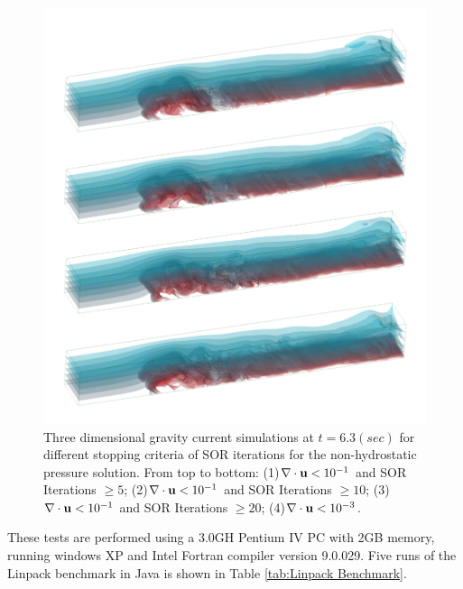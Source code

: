 \begin{figure}[htb]
\hspace{0.0in}
\includegraphics[width=5.8in]{../figures/ANH/3D/ANH-3D.pdf}
\caption{Three dimensional gravity current simulations at $t = 6.3 (sec)$ for different stopping criteria of SOR iterations for the non-hydrostatic pressure solution.
From top to bottom:
(1)$\nabla \cdot \mathbf{u} < 10^{-1}$ and SOR Iterations $\geq 5  $;
(2)$\nabla \cdot \mathbf{u} < 10^{-1}$ and SOR Iterations $\geq 10  $;
(3)$\nabla \cdot \mathbf{u} < 10^{-1}$ and SOR Iterations $\geq 20  $;
(4)$\nabla \cdot \mathbf{u} < 10^{-3}$.}
\label{fig:ANH-summary-3D}
\end{figure}

These tests are performed using a 3.0GH Pentium IV PC with 2GB memory, running windows XP and Intel Fortran compiler version 9.0.029. Five runs of the Linpack benchmark \cite{Dongarra2006} in Java is shown in Table \ref{tab:Linpack Benchmark}.

